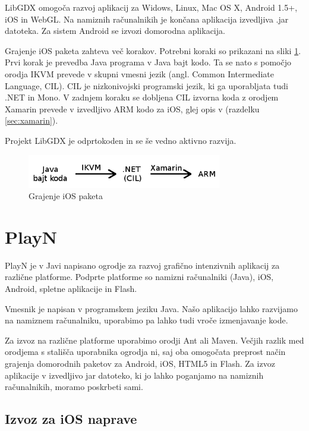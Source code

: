 LibGDX omogoča razvoj aplikacij za Widows, Linux, Mac OS X, Android 1.5+, iOS in WebGL. Na namiznih računalnikih je končana aplikacija izvedljiva .jar datoteka. Za sistem Android se izvozi domorodna aplikacija.

Grajenje iOS paketa zahteva več korakov. Potrebni koraki so prikazani na sliki \ref{libgdxss}. Prvi korak je prevedba Java programa v Java bajt kodo. Ta se nato s pomočjo orodja IKVM \cite{ikvm} prevede v skupni vmesni jezik (angl. Common Intermediate Language, CIL). CIL je nizkonivojski programski jezik, ki ga uporabljata tudi .NET in Mono. V zadnjem koraku se dobljena CIL izvorna koda z orodjem Xamarin prevede v izvedljivo ARM kodo za iOS, glej opis v (razdelku \ref{sec:xamarin}).

Projekt LibGDX je odprtokoden in se še vedno aktivno razvija.

\begin{figure}
\begin{center}
\includegraphics[width=8.5cm]{pic/javabajt.png}
\end{center}
\caption{Grajenje iOS paketa}
\label{libgdxss}
\end{figure} 

\section{PlayN}
\label{sec:playn}
PlayN \cite{playn} je v Javi napisano ogrodje za razvoj grafično intenzivnih aplikacij za različne platforme. Podprte platforme so namizni računalniki (Java), iOS, Android, spletne aplikacije in Flash.

Vmesnik je napisan v programskem jeziku Java. Našo aplikacijo lahko razvijamo na namiznem računalniku, uporabimo pa lahko tudi vroče izmenjavanje kode. 

Za izvoz na različne platforme uporabimo orodji Ant ali Maven. Večjih razlik med orodjema s stališča uporabnika ogrodja ni, saj oba omogočata preprost način grajenja domorodnih paketov za Android, iOS, HTML5 in Flash. Za izvoz aplikacije v izvedljivo jar datoteko, ki jo lahko poganjamo na namiznih računalnikih, moramo poskrbeti sami.  

\subsection{Izvoz za iOS naprave}

